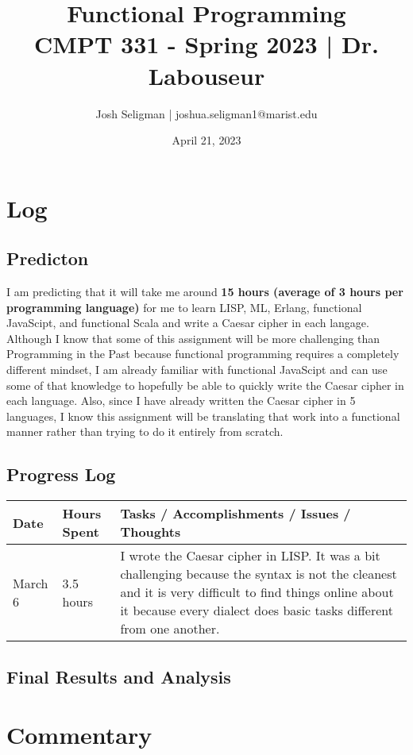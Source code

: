 \documentclass[letterpaper, 10pt, DIV=13]{scrartcl}
\title {
	\normalfont
	\huge{Functional Programming} \\
	\vspace{10pt}
	\large{CMPT 331 - Spring 2023 | Dr. Labouseur}
}
\author{\normalfont Josh Seligman | joshua.seligman1@marist.edu}
\date{\normalfont April 21, 2023}
\numberwithin{equation}{section}
\numberwithin{figure}{section}
\numberwithin{table}{section}
\begin{document}
\maketitle

\section{Log}
\subsection{Predicton}
I am predicting that it will take me around \textbf{15 hours (average of 3 hours per programming language)} for me to learn LISP, ML, Erlang, 
functional JavaScipt, and functional Scala and write a Caesar cipher in each langage. Although I know that some of this assignment will be more 
challenging than Programming in the Past because functional programming requires a completely different mindset, I am already familiar with 
functional JavaScipt and can use some of that knowledge to hopefully be able to quickly write the Caesar cipher in each language. Also, since I 
have already written the Caesar cipher in 5 languages, I know this assignment will be translating that work into a functional manner rather than 
trying to do it entirely from scratch. 

\subsection{Progress Log}
\begin{center}
	\begin{longtable}{|p{1in}|p{1in}|p{4in}|}
		\hline
		Date & Hours Spent & Tasks / Accomplishments / Issues / Thoughts
		\\
		\hline
        March 6 & 3.5 hours & I wrote the Caesar cipher in LISP. It was a bit challenging because the syntax is not the cleanest and it is very 
        difficult to find things online about it because every dialect does basic tasks different from one another.
        \\
		\hline
	\end{longtable}
\end{center}

\subsection{Final Results and Analysis}

\section{Commentary}
\end{document}
